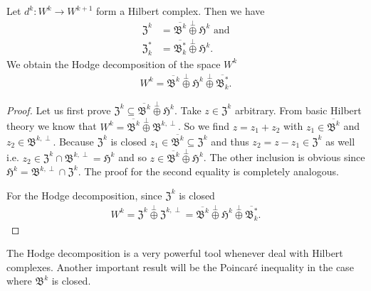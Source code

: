 \documentclass[../master_thesis.tex]{subfiles}
\begin{document}
\begin{theorem}\label{thm:hodge_decomposition}
    Let $d^k: W^k \rightarrow W^{k+1}$ form a Hilbert complex. 
    Then we have
    \begin{align*}
        \mathfrak{Z}^k &= \overline{\mathfrak{B}^k} \stackrel{\perp}{\oplus}
            \mathfrak{H}^k \text{ and}
        \\ \mathfrak{Z}^*_k &= 
            \overline{\mathfrak{B}^*_k} \stackrel{\perp}{\oplus}
            \mathfrak{H}^k.
    \end{align*}
    We obtain the Hodge decomposition of the space $W^k$
    \begin{align*}
        W^k = \overline{\mathfrak{B}^k} \stackrel{\perp}{\oplus}
            \mathfrak{H}^k \stackrel{\perp}{\oplus} \overline{\mathfrak{B}^*_k}.
    \end{align*}
\end{theorem}
\begin{proof}
    Let us first prove $\mathfrak{Z}^k \subseteq 
    \overline{\mathfrak{B}^k} \stackrel{\perp}{\oplus} \mathfrak{H}^k$.
    Take $z \in \mathfrak{Z}^k$ arbitrary. 
    From basic Hilbert theory we know that 
    $W^k = \overline{\mathfrak{B}^k} \stackrel{\perp}{\oplus} 
    \mathfrak{B}^{k,\perp}$. So we find $z = z_1 + z_2$ with
    $z_1 \in \overline{\mathfrak{B}^k}$ and $z_2 \in 
    \mathfrak{B}^{k,\perp}$. 
    Because $\mathfrak{Z}^k$ is closed 
    $z_1 \in \overline{\mathfrak{B}^k} \subseteq \mathfrak{Z}^k$ 
    and thus $z_2 = z - z_1 \in \mathfrak{Z}^k$ as well i.e. $z_2 \in \mathfrak{Z}^k 
    \cap \mathfrak{B}^{k,\perp} = \mathfrak{H}^k$ and so 
    $z \in \overline{\mathfrak{B}^k} \stackrel{\perp}{\oplus}
    \mathfrak{H}^k$. The other inclusion is obvious since 
    $\mathfrak{H}^k = \mathfrak{B}^{k,\perp} \cap \mathfrak{Z}^k$.
    The proof for the second equality is completely analogous. 

    For the Hodge decomposition, since $\mathfrak{Z}^k$ is closed 
    \begin{align*}
        W^k = \mathfrak{Z}^k \stackrel{\perp}{\oplus} \mathfrak{Z}^{k,\perp}
        =  \overline{\mathfrak{B}^k} \stackrel{\perp}{\oplus}
            \mathfrak{H}^k \stackrel{\perp}{\oplus} \overline{\mathfrak{B}^*_k}.
    \end{align*}
\end{proof}
The Hodge decomposition is a very powerful tool whenever deal with Hilbert
complexes. Another important result will be the Poincaré inequality 
in the case where $\mathfrak{B}^k$ is closed.
\end{document}
